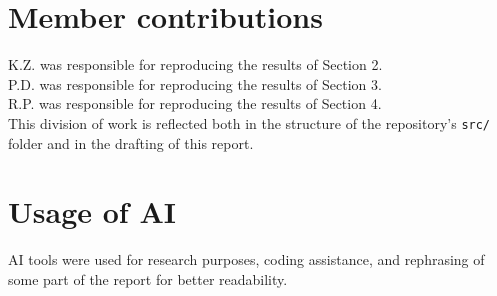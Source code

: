 \documentclass[10pt]{article} %
\begin{document}
\section*{Member contributions}
K.Z. was responsible for reproducing the results of Section 2. \\
P.D. was responsible for reproducing the results of Section 3. \\
R.P. was responsible for reproducing the results of Section 4. \\
This division of work is reflected both in the structure of the repository's \texttt{src/} folder and in the drafting of this report.

\section*{Usage of AI}
AI tools were used for research purposes, coding assistance, and rephrasing of some part of the report for better readability.

\newpage




\end{document}
